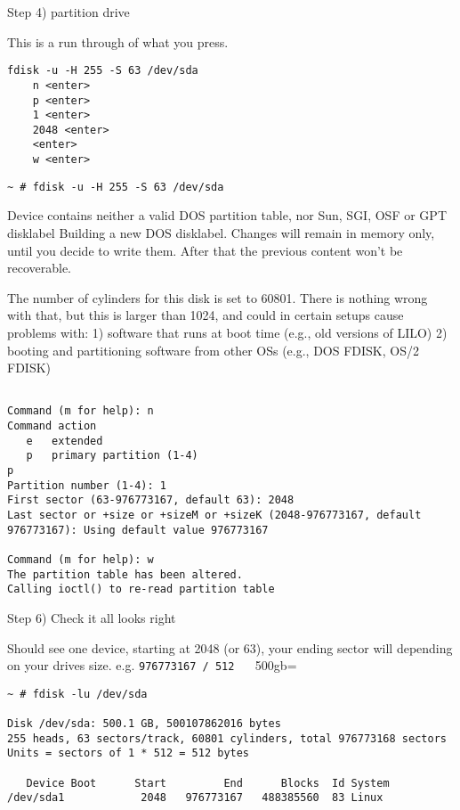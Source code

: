 \begin{itemize}
Step 4) partition drive

This is a run through of what you press.

\begin{verbatim}
fdisk -u -H 255 -S 63 /dev/sda
	n <enter>
	p <enter>
	1 <enter>
	2048 <enter>
	<enter>
	w <enter>
\end{verbatim}

\begin{verbatim}
~ # fdisk -u -H 255 -S 63 /dev/sda
\end{verbatim}

Device contains neither a valid DOS partition table, nor Sun, SGI, OSF or GPT disklabel
Building a new DOS disklabel. Changes will remain in memory only,
until you decide to write them. After that the previous content
won't be recoverable.


The number of cylinders for this disk is set to 60801.
There is nothing wrong with that, but this is larger than 1024,
and could in certain setups cause problems with:
1) software that runs at boot time (e.g., old versions of LILO)
2) booting and partitioning software from other OSs
   (e.g., DOS FDISK, OS/2 FDISK)
   
\begin{verbatim}

Command (m for help): n
Command action
   e   extended
   p   primary partition (1-4)
p
Partition number (1-4): 1
First sector (63-976773167, default 63): 2048
Last sector or +size or +sizeM or +sizeK (2048-976773167, default 976773167): Using default value 976773167

Command (m for help): w
The partition table has been altered.
Calling ioctl() to re-read partition table

\end{verbatim}

Step 6) Check it all looks right

Should see one device, starting at 2048 (or 63), your ending sector will depending on your drives size. e.g. \verb=976773167 / 512 = ~ 500gb=

\begin{verbatim}
~ # fdisk -lu /dev/sda

Disk /dev/sda: 500.1 GB, 500107862016 bytes
255 heads, 63 sectors/track, 60801 cylinders, total 976773168 sectors
Units = sectors of 1 * 512 = 512 bytes

   Device Boot      Start         End      Blocks  Id System
/dev/sda1            2048   976773167   488385560  83 Linux
\end{verbatim}


\end{itemize}
